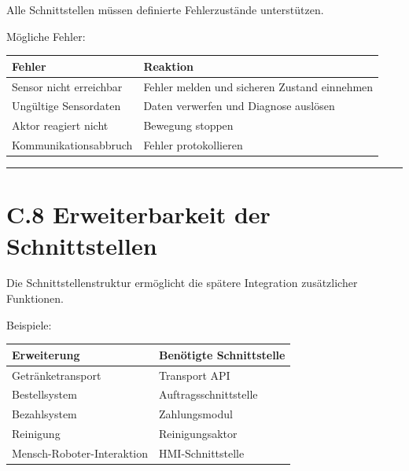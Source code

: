 \documentclass[
  a4paper,
  12pt,
  DIV=12,        %
  parskip=half,  %
  headings=small %
]{scrartcl}
\theoremstyle{definition}
\theoremstyle{definition}
\begin{document}
Alle Schnittstellen müssen definierte Fehlerzustände unterstützen.

Mögliche Fehler:

\begin{longtable}[]{@{}
  >{\raggedright\arraybackslash}p{}
  >{\raggedright\arraybackslash}p{}@{}}
\toprule\noalign{}
\begin{minipage}[b]{\linewidth}\raggedright
Fehler
\end{minipage} & \begin{minipage}[b]{\linewidth}\raggedright
Reaktion
\end{minipage} \\
\midrule\noalign{}
\endhead
\bottomrule\noalign{}
\endlastfoot
Sensor nicht erreichbar & Fehler melden und sicheren Zustand
einnehmen \\
Ungültige Sensordaten & Daten verwerfen und Diagnose auslösen \\
Aktor reagiert nicht & Bewegung stoppen \\
Kommunikationsabbruch & Fehler protokollieren \\
\end{longtable}

\begin{center}\rule{0.5\linewidth}{0.5pt}\end{center}

\section{C.8 Erweiterbarkeit der
Schnittstellen}\label{c.8-erweiterbarkeit-der-schnittstellen}

Die Schnittstellenstruktur ermöglicht die spätere Integration
zusätzlicher Funktionen.

Beispiele:

\begin{longtable}[]{@{}ll@{}}
\toprule\noalign{}
Erweiterung & Benötigte Schnittstelle \\
\midrule\noalign{}
\endhead
\bottomrule\noalign{}
\endlastfoot
Getränketransport & Transport API \\
Bestellsystem & Auftragsschnittstelle \\
Bezahlsystem & Zahlungsmodul \\
Reinigung & Reinigungsaktor \\
Mensch-Roboter-Interaktion & HMI-Schnittstelle \\
\end{longtable}
\end{document}
